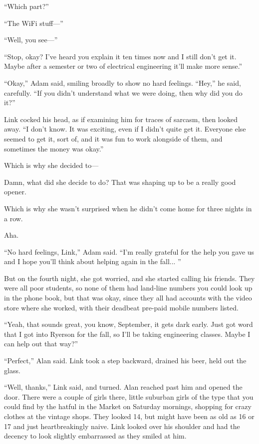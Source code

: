 ``Which part?''

``The WiFi stuff---''

``Well, you see---''

``Stop, okay?  I've heard you explain it ten times now and I still
don't get it.  Maybe after a semester or two of electrical engineering
it'll make more sense.''

``Okay,'' Adam said, smiling broadly to show no hard feelings. 
``Hey,'' he said, carefully.  ``If you didn't understand what we were
doing, then why did you do it?''

Link cocked his head, as if examining him for traces of sarcasm, then
looked away.  ``I don't know.  It was exciting, even if I didn't quite
get it.  Everyone else seemed to get it, sort of, and it was fun to
work alongside of them, and sometimes the money was okay.''

Which is why she decided to---

Damn, what did she decide to do?  That was shaping up to be a really
good opener.

Which is why she wasn't surprised when he didn't come home for three
nights in a row.

Aha.

``No hard feelings, Link,'' Adam said.  ``I'm really grateful for the
help you gave us and I hope you'll think about helping again in the
fall...  ''

But on the fourth night, she got worried, and she started calling his
friends.  They were all poor students, so none of them had land-line
numbers you could look up in the phone book, but that was okay, since
they all had accounts with the video store where she worked, with
their deadbeat pre-paid mobile numbers listed.

``Yeah, that sounds great, you know, September, it gets dark early. 
Just got word that I got into Ryerson for the fall, so I'll be taking
engineering classes.  Maybe I can help out that way?''

``Perfect,'' Alan said.  Link took a step backward, drained his beer,
held out the glass.

``Well, thanks,'' Link said, and turned.  Alan reached past him and
opened the door.  There were a couple of girls there, little suburban
girls of the type that you could find by the hatful in the Market on
Saturday mornings, shopping for crazy clothes at the vintage shops. 
They looked 14, but might have been as old as 16 or 17 and just
heartbreakingly naive.  Link looked over his shoulder and had the
decency to look slightly embarrassed as they smiled at him.

